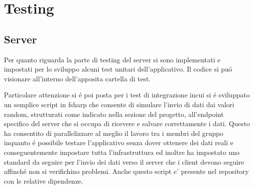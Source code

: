 \section{Testing}

\subsection{Server}

Per quanto riguarda la parte di testing del server si sono implementati e impostati per lo sviluppo alcuni test unitari dell'applicativo. Il codice si pu\'o visionare all'interno dell'apposita cartella di test.

Particolare attenzione si \'e poi posta per i test di integrazione incui si \'e sviluppato un semplice script in fsharp che consente di simulare l'invio di dati dai valori random, strutturati come indicato nella sezione del progetto, all'endpoint specifico del server che si occupa di ricevere e salvare correttamente i dati. Questo ha consentito di parallelizzare al meglio il lavoro tra i membri del gruppo inquanto \'e possibile testare l'applicativo senza dover ottenere dei dati reali e conseguentemente impostare tutta l'infrastruttura ed inoltre ha impostato uno standard da seguire per l'invio dei dati verso il server che i client devono seguire affinch\'e non si verifichino problemi. Anche questo script e' presente nel repository con le relative dipendenze.
